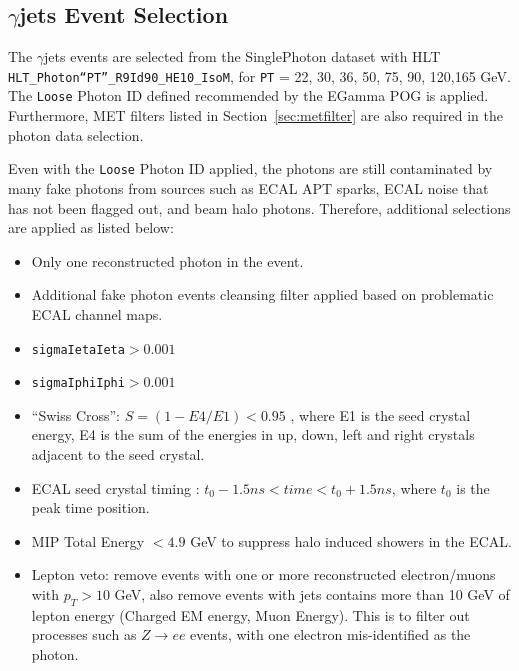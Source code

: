 \subsection{$\gamma$jets Event Selection}
The $\gamma$jets events are selected from the SinglePhoton dataset with HLT \texttt{HLT\_Photon``PT''\_R9Id90\_HE10\_IsoM}, for \texttt{PT} = 22, 30, 36, 50, 75, 90, 120,165 GeV. The \texttt{Loose} Photon ID defined recommended by the EGamma POG is applied. Furthermore, MET filters listed in Section~\ref{sec:metfilter} are also required in the photon data selection.

\vspace{0.3cm}
Even with the \texttt{Loose} Photon ID applied, the photons are still contaminated by many fake photons from sources such as ECAL APT sparks, ECAL noise that has not been flagged out, and beam halo photons. Therefore, additional selections are applied as listed below:
\begin{itemize}
\item Only one reconstructed photon in the event. 
\item Additional fake photon events cleansing filter applied based on problematic ECAL channel maps.
\item \texttt{sigmaIetaIeta}$>0.001$
\item \texttt{sigmaIphiIphi}$>0.001$  
\item ``Swiss Cross'':  $S = (1-E4/E1)<0.95$ , where E1 is the seed crystal energy, E4 is the sum of the energies in up, down, left and right crystals adjacent to the seed crystal.
\item ECAL seed crystal timing :   $t_0-1.5 ns < time < t_0+1.5 ns$, where $t_0$ is the peak time position. 
\item MIP Total Energy $< 4.9$ GeV to suppress halo induced showers in the ECAL.
\item Lepton veto: remove events with one or more reconstructed electron/muons with $ p_T > 10$ GeV, 
also remove events with jets contains more than 10 GeV of lepton energy (Charged EM energy, Muon Energy). 
This is to filter out processes such as $Z\to ee$ events, with one electron mis-identified as the photon. 
\end{itemize}

